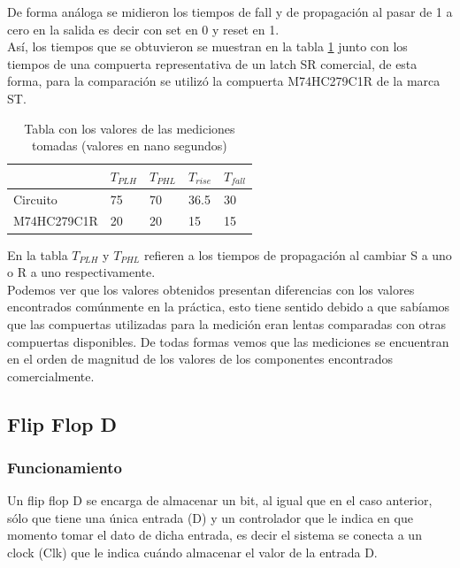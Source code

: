%
\noindent
De forma análoga se midieron los tiempos de fall y de propagación al pasar de 1 a cero en la salida es decir con set en 0 y reset en 1.\\
%
\noindent
Así, los tiempos que se obtuvieron se muestran en la tabla \ref{ej6_tabla_mediciones_latch} junto con los tiempos de una compuerta representativa de un latch SR comercial, de esta forma, para la comparación se utilizó la compuerta M74HC279C1R de la marca ST. 
%
\begin{table}[H]
\caption{Tabla con los valores de las mediciones tomadas (valores en nano segundos)}
\label{ej6_tabla_mediciones_latch}
\centering
\begin{tabular}{|l||l|l|l|l|}
\hline 
            & $T_{PLH}$ & $T_{PHL}$ & $T_{rise}$ & $T_{fall}$ \\ \hline \hline
Circuito    & 75        & 70        & 36.5       & 30         \\ \hline
M74HC279C1R & 20        & 20        & 15         & 15         \\ \hline
\end{tabular}
\end{table}
%
\noindent
En la tabla $T_{PLH}$ y $T_{PHL}$ refieren a los tiempos de propagación al cambiar S a uno o R a uno respectivamente.\\
Podemos ver que los valores obtenidos presentan diferencias con los valores encontrados comúnmente en la práctica, esto tiene sentido debido a que sabíamos que las compuertas utilizadas para la medición eran lentas comparadas con otras compuertas disponibles. De todas formas vemos que las mediciones se encuentran en el orden de magnitud de los valores de los componentes encontrados comercialmente.
%
\subsection{Flip Flop D}
%
\subsubsection{Funcionamiento}
\noindent
Un flip flop D se encarga de almacenar un bit, al igual que en el caso anterior, sólo que tiene una única entrada (D) y un controlador que le indica en que momento tomar el dato de dicha entrada, es decir el sistema se conecta a un clock (Clk) que le indica cuándo almacenar el valor de la entrada D.
%
